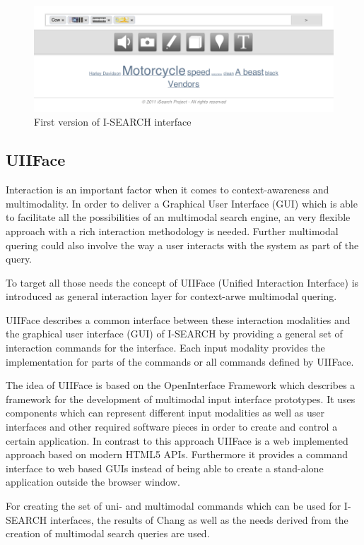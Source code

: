 \documentclass[runningheads,a4paper]{llncs} \usepackage[utf8]{inputenc}
\begin{document}
\begin{figure}[h!]
  \centering
    \includegraphics[width=0.8\linewidth]{resources/isearch-UI.png}
  \caption{First version of \mbox{I-SEARCH} interface}
  \label{fig:isearch-ui}
\end{figure}

\subsection{UIIFace}

Interaction is an important factor when it comes to context-awareness and
multimodality. In order to deliver a Graphical User Interface (GUI) which is
able to facilitate all the possibilities of an multimodal search engine, an
very flexible approach with a rich interaction methodology is needed. 
Further multimodal quering could also involve the way a user interacts with the
system as part of the query. 

To target all those needs the concept of UIIFace (Unified Interaction Interface)
is introduced as general interaction layer for context-arwe multimodal quering.

UIIFace describes a common interface between these interaction modalities and the 
graphical user interface (GUI) of I-SEARCH by providing a general set of interaction 
commands for the interface. Each input modality provides the implementation 
for parts of the commands or all commands defined by UIIFace. 

The idea of UIIFace is based on the OpenInterface Framework \cite{openinterface}
which describes a framework for the development of multimodal input interface
prototypes. It uses components which can represent different input modalities as
well as user interfaces and other required software pieces in order to create
and control a certain application. In contrast to this approach UIIFace is a web
implemented approach based on modern HTML5 APIs. Furthermore it provides a
command interface to web based GUIs instead of being able to create a
stand-alone application outside the browser window.

For creating the set of uni- and multimodal commands which can be used for
I-SEARCH interfaces, the results of Chang \cite{chang} as well as the needs
derived from the creation of multimodal search queries are used.
\end{document}
